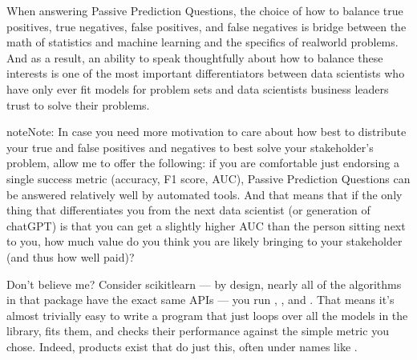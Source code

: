 \documentclass[letterpaper,10pt,english]{jupyterBook}
\begin{document}
\sphinxAtStartPar
When answering Passive Prediction Questions, the choice of how to balance true positives, true negatives, false positives, and false negatives is  bridge between the math of statistics and machine learning and the specifics of real\sphinxhyphen{}world problems. And as a result, an ability to speak thoughtfully about how to balance these interests is one of the most important differentiators between data scientists who have only ever fit models for problem sets and data scientists business leaders trust to solve their problems.

\begin{sphinxadmonition}{note}{Note:}
\sphinxAtStartPar
In case you need more motivation to care about how best to distribute your true and false positives and negatives to best solve your stakeholder’s problem, allow me to offer the following: if you are comfortable just endorsing a single success metric (accuracy, F1 score, AUC),  Passive Prediction Questions can be answered relatively well by automated tools. And that means that if the only thing that differentiates you from the next data scientist (or generation of chatGPT) is that you can get a slightly higher AUC than the person sitting next to you, how much value do you think you are likely bringing to your stakeholder (and thus how well paid)?

\sphinxAtStartPar
Don’t believe me? Consider scikit\sphinxhyphen{}learn — by design, nearly all of the algorithms in that package have the exact same APIs — you run , , and . That means it’s almost trivially easy to write a program that just loops over all the models in the library, fits them, and checks their performance against the simple metric you chose. Indeed, products exist that do just this, often under names like .


\end{sphinxadmonition}
\end{document}
